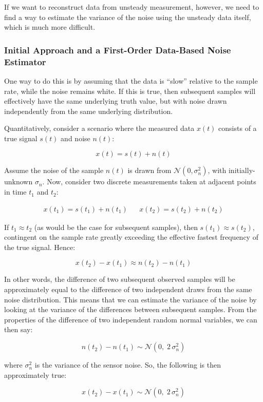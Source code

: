 If we want to reconstruct data from unsteady measurement, however, we need to find a way to estimate the variance of the noise using the unsteady data itself, which is much more difficult.

\subsubsection{Initial Approach and a First-Order Data-Based Noise Estimator}

One way to do this is by assuming that the data is ``slow'' relative to the sample rate, while the noise remains white. If this is true, then subsequent samples will effectively have the same underlying truth value, but with noise drawn independently from the same underlying distribution.

Quantitatively, consider a scenario where the measured data $x(t)$ consists of a true signal $s(t)$ and noise $n(t)$:

$$x(t) = s(t) + n(t)$$

Assume the noise of the sample $n(t)$ is drawn from $\mathcal{N}(0, \sigma^2_n)$, with initially-unknown $\sigma_n$. Now, consider two discrete measurements taken at adjacent points in time $t_1$ and $t_2$:

\begin{align*}
    x(t_1) = s(t_1) + n(t_1) &&
    x(t_2) = s(t_2) + n(t_2)
\end{align*}

\noindent If $t_1 \approx t_2$ (as would be the case for subsequent samples), then $s(t_1) \approx s(t_2)$, contingent on the sample rate greatly exceeding the effective fastest frequency of the true signal. Hence:

$$x(t_2) - x(t_1) \approx n(t_2) - n(t_1)$$

In other words, the difference of two subsequent observed samples will be approximately equal to the difference of two independent draws from the same noise distribution. This means that we can estimate the variance of the noise by looking at the variance of the differences between subsequent samples. From the properties of the difference of two independent random normal variables, we can then say:

$$n(t_2) - n(t_1) \sim \mathcal{N}(0,\; 2\, \sigma^2_n)$$

\noindent where $\sigma^2_n$ is the variance of the sensor noise. So, the following is then approximately true:

$$x(t_2) - x(t_1) \sim \mathcal{N}(0,\; 2\, \sigma^2_n)$$

